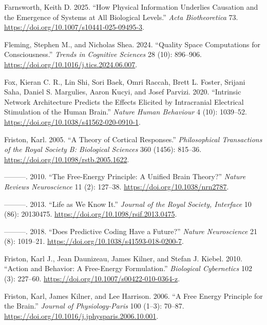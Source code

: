 \documentclass[
  a4paper]{article}
\newlength{\cslhangindent}
\newenvironment{CSLReferences}[2] %
 {\begin{list}{}{%
  \setlength{\itemindent}{0pt}
  \setlength{\leftmargin}{0pt}
  \setlength{\parsep}{0pt}
  \ifodd #1
   \setlength{\leftmargin}{\cslhangindent}
   \setlength{\itemindent}{-1\cslhangindent}
  \fi
  \setlength{\itemsep}{#2\baselineskip}}}
 {\end{list}}
\begin{document}
\begin{CSLReferences}{1}{0}
Farnsworth, Keith D. 2025. {``How Physical Information Underlies
Causation and the Emergence of Systems at All Biological Levels.''}
\emph{Acta Biotheoretica} 73.
\url{https://doi.org/10.1007/s10441-025-09495-3}.

Fleming, Stephen M., and Nicholas Shea. 2024. {``Quality Space
Computations for Consciousness.''} \emph{Trends in Cognitive Sciences}
28 (10): 896--906. \url{https://doi.org/10.1016/j.tics.2024.06.007}.

Fox, Kieran C. R., Lin Shi, Sori Baek, Omri Raccah, Brett L. Foster,
Srijani Saha, Daniel S. Margulies, Aaron Kucyi, and Josef Parvizi. 2020.
{``Intrinsic Network Architecture Predicts the Effects Elicited by
Intracranial Electrical Stimulation of the Human Brain.''} \emph{Nature
Human Behaviour} 4 (10): 1039--52.
\url{https://doi.org/10.1038/s41562-020-0910-1}.

Friston, Karl. 2005. {``A Theory of Cortical Responses.''}
\emph{Philosophical Transactions of the Royal Society B: Biological
Sciences} 360 (1456): 815--36.
\url{https://doi.org/10.1098/rstb.2005.1622}.

---------. 2010. {``The Free-Energy Principle: A Unified Brain
Theory?''} \emph{Nature Reviews Neuroscience} 11 (2): 127--38.
\url{https://doi.org/10.1038/nrn2787}.

---------. 2013. {``Life as We Know It.''} \emph{Journal of the Royal
Society, Interface} 10 (86): 20130475.
\url{https://doi.org/10.1098/rsif.2013.0475}.

---------. 2018. {``Does Predictive Coding Have a Future?''}
\emph{Nature Neuroscience} 21 (8): 1019--21.
\url{https://doi.org/10.1038/s41593-018-0200-7}.

Friston, Karl J., Jean Daunizeau, James Kilner, and Stefan J. Kiebel.
2010. {``Action and Behavior: A Free-Energy Formulation.''}
\emph{Biological Cybernetics} 102 (3): 227--60.
\url{https://doi.org/10.1007/s00422-010-0364-z}.

Friston, Karl, James Kilner, and Lee Harrison. 2006. {``A Free Energy
Principle for the Brain.''} \emph{Journal of Physiology-Paris} 100
(1--3): 70--87. \url{https://doi.org/10.1016/j.jphysparis.2006.10.001}.


\end{CSLReferences}
\end{document}
